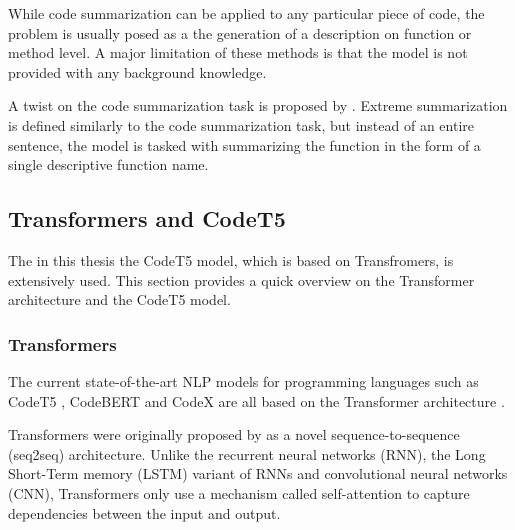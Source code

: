 While code summarization can be applied to any particular piece of code, the problem is usually posed as a the generation of a description on function or method level. A major limitation of these methods is that the model is not provided with any background knowledge. 

A twist on the code summarization task is proposed by \citeauthor{ExtremeSummarization}. Extreme summarization is defined similarly to the code summarization task, but instead of an entire sentence, the model is tasked with summarizing the function in the form of a single descriptive function name.

\subsection{Transformers and CodeT5}
The in this thesis the CodeT5 model, which is based on Transfromers, is extensively used. This section provides a quick overview on the Transformer architecture and the CodeT5 model.

\subsubsection{Transformers}
The current state-of-the-art NLP models for programming languages such as CodeT5 \cite{CodeT5}, CodeBERT \cite{CodeBERT} and CodeX \cite{CodeX} are all based on the Transformer architecture \cite{Transformers}.

Transformers were originally proposed by \citeauthor{Transformers} as a novel sequence-to-sequence (seq2seq) architecture. Unlike the recurrent neural networks (RNN), the Long Short-Term memory (LSTM) variant of RNNs and convolutional neural networks (CNN), Transformers only use a mechanism called self-attention to capture dependencies between the input and output. 

